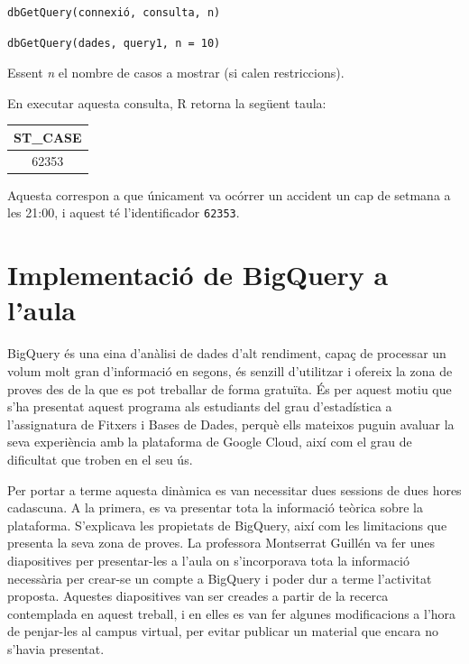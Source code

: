 \documentclass[12pt,longbibliography]{article}
\theoremstyle{definition}
\theoremstyle{remark}
\begin{document}
\begin{multicols}{2}

\begin{verbatim}
dbGetQuery(connexió, consulta, n)
\end{verbatim}

\columnbreak

\begin{verbatim}
dbGetQuery(dades, query1, n = 10)
\end{verbatim}

\end{multicols}

Essent \emph{n} el nombre de casos a mostrar (si calen restriccions).


En executar aquesta consulta, R retorna la següent taula:

\begin{table}[h]
\centering
\begin{tabular}{|c|}
\hline
\textbf{ST\_CASE} \\ \hline
62353             \\ \hline
\end{tabular}
\end{table}

Aquesta correspon a que únicament va ocórrer un accident un cap de setmana a les 21:00, i aquest té l'identificador \texttt{62353}.

\newpage



\section{Implementació de BigQuery a l'aula}

BigQuery és una eina d'anàlisi de dades d'alt rendiment, capaç de processar un volum molt gran d'informació en segons, és senzill d'utilitzar i ofereix la zona de proves des de la que es pot treballar de forma gratuïta. És per aquest motiu que s'ha presentat aquest programa als estudiants del grau d'estadística a l'assignatura de Fitxers i Bases de Dades, perquè ells mateixos puguin avaluar la seva experiència amb la plataforma de Google Cloud, així com el grau de dificultat que troben en el seu ús.

Per portar a terme aquesta dinàmica es van necessitar dues sessions de dues hores cadascuna. A la primera, es va presentar tota la informació teòrica sobre la plataforma. S'explicava les propietats de BigQuery, així com les limitacions que presenta la seva zona de proves. La professora Montserrat Guillén va fer unes diapositives per presentar-les a l'aula on s'incorporava tota la informació necessària per crear-se un compte a BigQuery i poder dur a terme l'activitat proposta. Aquestes diapositives van ser creades a partir de la recerca contemplada en aquest treball, i en elles es van fer algunes modificacions a l'hora de penjar-les al campus virtual, per evitar publicar un material que encara no s'havia presentat.
\end{document}
